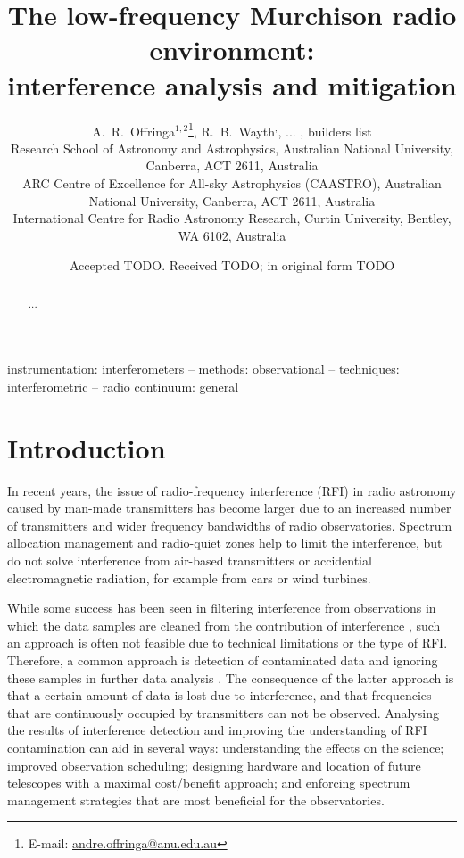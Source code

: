 \documentclass[useAMS,usenatbib]{mn2e}
\title[The Murchison radio environment]{The low-frequency Murchison radio environment:\\interference analysis and mitigation}
\author[A.~R.~Offringa et al.]{A.~R.~Offringa$^{1,2}$\thanks{\editmark{Corresponding author.} E-mail: \url{andre.offringa@anu.edu.au}},
R.~B.~Wayth\Curtin$^,$\CAASTRO, ... , %
builders list
\\
\ANU{}Research School of Astronomy and Astrophysics, Australian National University, Canberra, ACT 2611, Australia \\
\CAASTRO{}ARC Centre of Excellence for All-sky Astrophysics (CAASTRO), Australian National University, Canberra, ACT 2611, Australia \\
\Curtin{}International Centre for Radio Astronomy Research, Curtin University, Bentley, WA 6102, Australia\\
}
\begin{document}
\date{Accepted TODO. Received TODO; in original form TODO}
\pagerange{\pageref{firstpage}--\pageref{lastpage}}

\label{firstpage}
\maketitle

\begin{abstract}
...
\end{abstract}

\begin{keywords}
instrumentation: interferometers -- methods: observational -- techniques: interferometric -- radio continuum: general
\end{keywords}

\section{Introduction}
In recent years, the issue of radio-frequency interference (RFI) in radio astronomy caused by man-made transmitters has become larger due to an increased number of transmitters and wider frequency bandwidths of radio observatories. Spectrum allocation management and radio-quiet zones help to limit the interference, but do not solve interference from air-based transmitters or accidential electromagnetic radiation, for example from cars or wind turbines.

While some success has been seen in filtering interference from observations in which the data samples are cleaned from the contribution of interference \citep{spatial-filtering-parkes-multibeam-for-pulses,rfi-spatial-processing-hellbourg-2014}, such an approach is often not feasible due to technical limitations or the type of RFI. Therefore, a common approach is detection of contaminated data and ignoring these samples in further data analysis \citep{post-correlation-rfi-classification}. The consequence of the latter approach is that a certain amount of data is lost due to interference, and that frequencies that are continuously occupied by transmitters can not be observed. Analysing the results of interference detection and improving the understanding of RFI contamination can aid in several ways: understanding the effects on the science; improved observation scheduling; designing hardware and location of future telescopes with a maximal cost/benefit approach; and enforcing spectrum management strategies that are most beneficial for the observatories.
\end{document}
